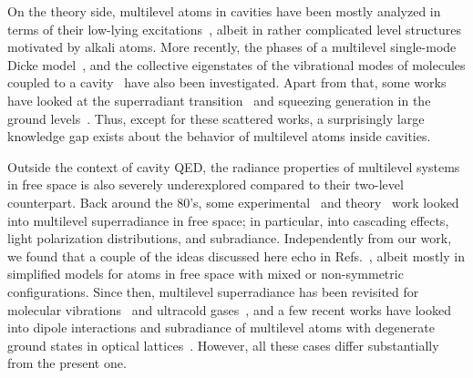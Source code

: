 \documentclass[aps,prx,superscriptaddress,twocolumn,notitlepage,nofootinbib,longbibliography]{revtex4-2}
\begin{document}
On the theory side, multilevel atoms in cavities have been mostly analyzed in terms of their low-lying excitations~\cite{Kimble_PRA74,Birnbaum_thesis2005,Clemens_PRA81}, albeit in rather complicated level structures motivated by alkali atoms.
More recently, the phases of a multilevel single-mode Dicke model~\cite{PuXu_arxiv2020}, and the collective eigenstates of the vibrational modes of molecules coupled to a cavity~\cite{CamposGonzalez_arxiv2021} have also been investigated.
Apart from that, some works have looked at the superradiant transition~\cite{Demler_PRA101} and squeezing generation in the ground levels~\cite{Deutsch_PRL109,MolmerKurucz_PRA81,ParkinsMasson_PRL2017}.
Thus, except for these scattered works, a surprisingly large knowledge gap exists about the behavior of multilevel atoms inside cavities.

Outside the context of cavity QED, the radiance properties of multilevel systems in free space is also severely underexplored compared to their two-level counterpart.
Back around the 80's, some experimental~\cite{CrubellierPillet_PRL1978, Gounand_JPB1979, Crubellier_IOP1981, Crubellier_JPB1984, CrubellierPavolini_PRL1985} and theory~\cite{Crubellier_PRA1977, Crubellier_PRA1978, CrubellierPillet_OptComm1980, CrubellierPavolini_JPB1985, CrubellierPavolini_JPB1986, CrubellierPavolini_JPB1987, Mukunda_1_JMP1988, Mukunda_2_JMP1988, Reshetov_JPB1993, Reshetov_JPB1995} work looked into multilevel superradiance in free space; in particular, into cascading effects, light polarization distributions, and subradiance.
Independently from our work, we found that a couple of the ideas discussed here echo in Refs.~\cite{GrossHarocheSuperr,CrubellierPavolini_JPB1985, CrubellierPavolini_JPB1986, CrubellierPavolini_JPB1987}, albeit mostly in simplified models for atoms in free space  with mixed or non-symmetric configurations.
Since then, multilevel superradiance has been revisited for molecular vibrations~\cite{YelinLin_PRA85,YelinLin_MolPhys2013} and ultracold gases~\cite{Robicheaux_PRA2017}, and a few recent works have looked into dipole interactions and subradiance of multilevel atoms with degenerate ground states in optical lattices~\cite{RitschPRL118, ChangMunro_PRA2018, Asenjo_PNAS2019, Orioli_PRL123, Orioli_PRA101}.
However, all these cases differ substantially from the present one.
\end{document}
